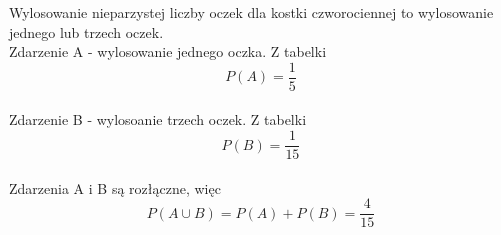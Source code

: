\medskip
{} 
\medskip

Wylosowanie nieparzystej liczby oczek dla kostki czworociennej to wylosowanie jednego lub trzech oczek. \\
Zdarzenie A - wylosowanie jednego oczka. Z tabelki 
\[ P(A)=\frac{1}{5} \] \\
Zdarzenie B - wylosoanie trzech oczek. Z tabelki 
\[ P(B)=\frac{1}{15} \] \\
Zdarzenia A i B są rozłączne, więc
 \[ P(A{\cup}B) = P(A) + P(B) = \frac{4}{15} \] \\
